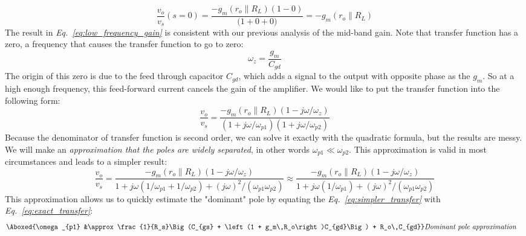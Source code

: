     \begin{equation}
        \frac{v_{o}}{v_{s}}(s = 0) = \frac{-g_m\left(r_o \parallel R_L\right)\left(1 - 0\right)}
                                        {\big(1 + 0 + 0\big)}
        = \boxed{-g_m\left(r_o \parallel R_L\right)}
        \label{eq:low_frequency_gain}
    \end{equation}
The result in \emph{Eq.~\ref{eq:low_frequency_gain}} is consistent with our previous analysis of the mid-band gain.  Note that transfer function has a zero, a frequency that causes the transfer function to go to zero:
    \begin{equation} 
        {\omega_z} = \frac{g_m}{C_{gd}}
    \end{equation}
The origin of this zero is due to the feed through capacitor $C_{gd}$, which adds a signal to the output with opposite phase as the $g_m$.  So at a high enough frequency, this feed-forward current cancels the gain of the amplifier.  We would like to put the transfer function into the following form:
    \begin{equation}
        \frac{v_{o}}{v_{s}} = 
            \frac{-g_m\left(r_o \parallel R_L\right) \left(1 - j\omega / \omega_z \right)}
            {\left(1 + j\omega / \omega_{p1}\right) \left(1 + j\omega / \omega_{p2} \right)}
    \end{equation}
Because the denominator of transfer function is second order, we can solve it exactly with the quadratic formula, but the results are messy.  We will make an \textit{approximation that the poles are widely separated}, in other words $\omega_{p1} \ll \omega_{p2}$.  This approximation is valid in most circumstances and leads to a simpler result:
    \begin{equation}
        \frac{v_{o}}{v_{s}} = 
        \frac{-g_m\left(r_o \parallel R_L\right)\left(1 - j\omega / \omega_z\right)}
                {1 + j\omega\left(1 / \omega_{p1} + 1/\omega_{p2}\right) + (j\omega)^2 / (\omega_{p1}\omega_{p2})}
        \approx \frac{-g_m\left(r_o \parallel R_L\right)\left(1 - j\omega / \omega_z\right)}
                {1 + j\omega\left(1 / \omega_{p1}\right) + (j\omega)^2 / (\omega_{p1}\omega_{p2})}
        \label{eq:simpler_transfer}
    \end{equation}
This approximation allows us to quickly estimate the "dominant" pole by equating the \emph{Eq.~\ref{eq:simpler_transfer}} with \emph{Eq.~\ref{eq:exact_transfer}}:
    \begin{align} 
        \Aboxed{\omega_{p1} &\approx \frac{1}{R_s}\Big(C_{gs} + \left(1 + g_m\,R_o\right)C_{gd}\Big) + R_o\,C_{gd}}
        &\textit{Dominant pole approximation}
        \label{eq:pole_almost_exact}
    \end{align}
